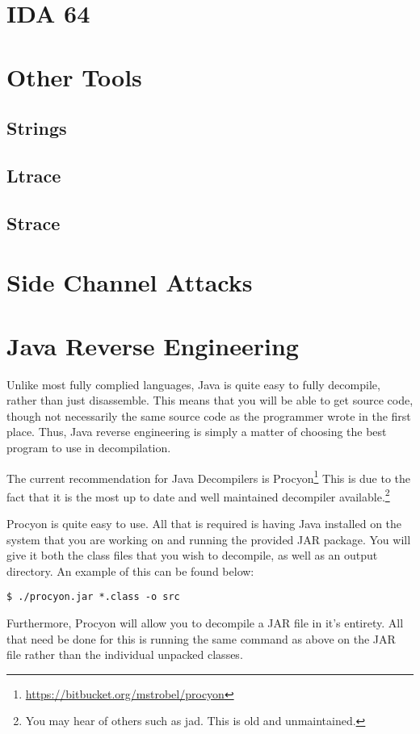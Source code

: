 	\section{IDA 64}
	\section{Other Tools}
		\subsection{Strings}
		\subsection{Ltrace}
		\subsection{Strace}
	\section{Side Channel Attacks}
	\section{Java Reverse Engineering}
		Unlike most fully complied languages, Java is quite easy to fully decompile, rather than just disassemble. 
		This means that you will be able to get source code, though not necessarily the same source code as the programmer wrote in the first place. 
		Thus, Java reverse engineering is simply a matter of choosing the best program to use in decompilation. 

		The current recommendation for Java Decompilers is Procyon\footnote{\url{https://bitbucket.org/mstrobel/procyon}}
		This is due to the fact that it is the most up to date and well maintained decompiler available.\footnote{You may hear of others such as jad. This is old and unmaintained.} 
		
		Procyon is quite easy to use. 
		All that is required is having Java installed on the system that you are working on and running the provided JAR package. 
		You will give it both the class files that you wish to decompile, as well as an output directory. 
		An example of this can be found below:
		\begin{lstlisting}[style=CLI]
			$ ./procyon.jar *.class -o src
		\end{lstlisting}

		Furthermore, Procyon will allow you to decompile a JAR file in it's entirety. 
		All that need be done for this is running the same command as above on the JAR file rather than the individual unpacked classes. 

